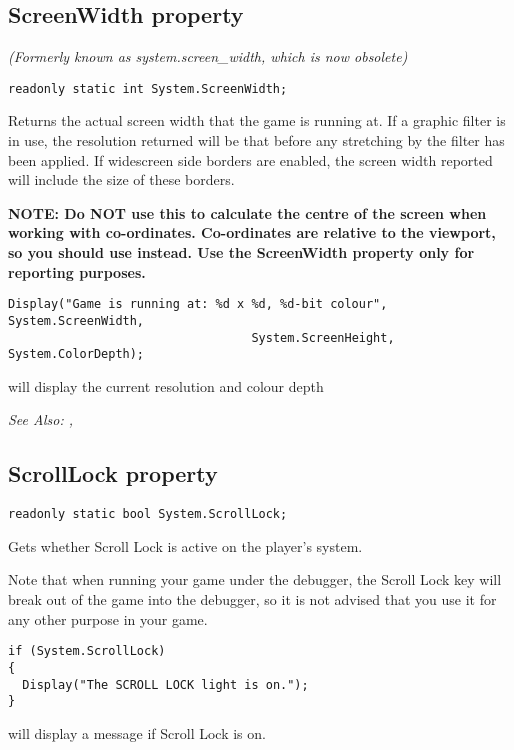\subsection{ScreenWidth property}\label{System.ScreenWidth}%

\it{(Formerly known as system.screen_width, which is now obsolete)}

\begin{verbatim}
readonly static int System.ScreenWidth;
\end{verbatim}
Returns the actual screen width that the game is running at.  If a graphic filter is in
use, the resolution returned will be that before any stretching by the filter has been
applied. If widescreen side borders are enabled, the screen width reported will include
the size of these borders.

\bf{NOTE:} Do \bf{NOT} use this to calculate the centre of the screen when working
with co-ordinates. Co-ordinates are relative to the viewport, so you should
use  instead. Use the ScreenWidth
property only for reporting purposes.

\begin{verbatim}
Display("Game is running at: %d x %d, %d-bit colour", System.ScreenWidth,
                                  System.ScreenHeight, System.ColorDepth);
\end{verbatim}
will display the current resolution and colour depth

\it{See Also:} ,


\subsection{ScrollLock property}\label{System.ScrollLock}%

\begin{verbatim}
readonly static bool System.ScrollLock;
\end{verbatim}
Gets whether Scroll Lock is active on the player's system.

Note that when running your game under the debugger, the Scroll Lock key will break
out of the game into the debugger, so it is not advised that you use it for any
other purpose in your game.

\begin{verbatim}
if (System.ScrollLock)
{
  Display("The SCROLL LOCK light is on.");
}
\end{verbatim}
will display a message if Scroll Lock is on.

